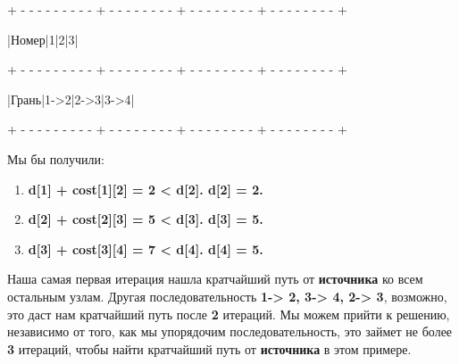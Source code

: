 \begin{tcolorbox}
{\tiny+ -  -  -  -  -  -  -  -  -  + -  -  -  -  -  -  -  -  + -  -  -  -  -  -  -  -  + -  -  -  -  -  -  -  -  +}

\hspace{0.4mm}|\hspace{2.7mm}Номер\hspace{2.7mm}|\hspace{6.82mm}1\hspace{6.82mm}|\hspace{6.82mm}2\hspace{6.82mm}|\hspace{6.82mm}3\hspace{6.82mm}|

{\tiny+ - - - - - - - - - + - - - - - - - - + - - - - - - - - + - - - - - - - - +}

\hspace{0.4mm}|\hspace{3mm}Грань\hspace{3mm}|\hspace{3.55mm}1->2\hspace{3.55mm}|\hspace{3.55mm}2->3\hspace{3.55mm}|\hspace{3.55mm}3->4\hspace{3.55mm}|

{\tiny+ - - - - - - - - - + - - - - - - - - + - - - - - - - - + - - - - - - - - +}
\end{tcolorbox}

Мы бы получили:

\begin{enumerate}
\item \textbf{d[1] + cost[1][2] = 2 < d[2]. d[2] = 2.}
\item \textbf{d[2] + cost[2][3] = 5 < d[3]. d[3] = 5.}
\item \textbf{d[3] + cost[3][4] = 7 < d[4]. d[4] = 5.}
\end{enumerate}

Наша самая первая итерация нашла кратчайший путь от \textbf{источника} ко всем остальным
узлам. Другая последовательность \textbf{1-> 2, 3-> 4, 2-> 3}, возможно, это даст нам кратчайший
путь после \textbf{2} итераций. Мы можем прийти к решению, независимо от того, как мы
упорядочим последовательность, это займет не более \textbf{3} итераций, чтобы найти кратчайший
путь от \textbf{источника} в этом примере.

\hspace{\baselineskip}

